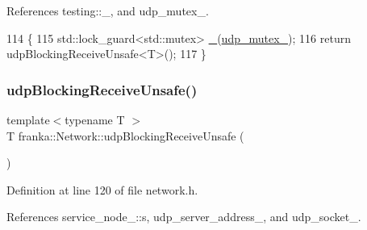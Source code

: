 References testing\+::\+\_\+, and udp\+\_\+mutex\+\_\+.


\begin{DoxyCode}
114                               \{
115   std::lock\_guard<std::mutex> \hyperlink{namespacetesting_a4ba77a3f5b67166ff1b59d96a32346a2}{\_}(\hyperlink{classfranka_1_1Network_ab22bfa46c27a565336d6231971b019be}{udp\_mutex\_});
116   \textcolor{keywordflow}{return} udpBlockingReceiveUnsafe<T>();
117 \}
\end{DoxyCode}
\mbox{\label{classfranka_1_1Network_abe956fd11cd59309c93aebe15d433242}} 
\subsubsection{\texorpdfstring{udp\+Blocking\+Receive\+Unsafe()}{udpBlockingReceiveUnsafe()}}
{\footnotesize\ttfamily template$<$typename T $>$ \\
T franka\+::\+Network\+::udp\+Blocking\+Receive\+Unsafe (\begin{DoxyParamCaption}{ }\end{DoxyParamCaption})\hspace{0.3cm}{\ttfamily [private]}}



Definition at line 120 of file network.\+h.



References service\+\_\+node\+\_\+::s, udp\+\_\+server\+\_\+address\+\_\+, and udp\+\_\+socket\+\_\+.


